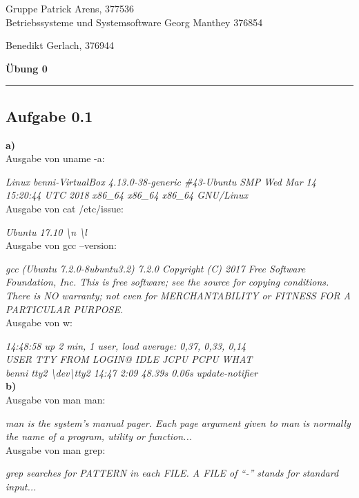 \documentclass[a4paper,graphics,11pt]{article}
\newcommand{\aufgabe}[1]{\subsection*{Aufgabe #1}}
\begin{document}
\noindent Gruppe              \hfill Patrick Arens, 377536\\
\noindent Betriebssysteme und Systemsoftware    \hfill Georg Manthey 376854\\
                                                \strut\hfill Benedikt Gerlach, 376944\\
\begin{center}
	\LARGE{\textbf{Übung 0}}
\end{center}
\begin{center}
\rule[0.1ex]{\textwidth}{1pt}
\end{center}

\aufgabe{0.1}
\textbf{a)}\\

Ausgabe von uname -a:

\textit{Linux benni-VirtualBox 4.13.0-38-generic \#43-Ubuntu SMP Wed Mar 14 15:20:44 UTC 2018 x86\_64 x86\_64 x86\_64 GNU/Linux}\\

Ausgabe von cat /etc/issue:

\textit{Ubuntu 17.10 \textbackslash n \textbackslash l}\\

Ausgabe von gcc --version:

\textit{gcc (Ubuntu 7.2.0-8ubuntu3.2) 7.2.0
Copyright (C) 2017 Free Software Foundation, Inc.
This is free software; see the source for copying conditions.  There is NO
warranty; not even for MERCHANTABILITY or FITNESS FOR A PARTICULAR PURPOSE.}\\

Ausgabe von w:

\textit{14:48:58 up 2 min,  1 user,  load average: 0,37, 0,33, 0,14\\
USER     TTY      FROM             LOGIN@   IDLE   JCPU   PCPU WHAT\\
benni    tty2     \textbackslash dev\textbackslash tty2        14:47    2:09  48.39s  0.06s update-notifier}\\

\textbf{b)}\\

Ausgabe von man man:
 
\textit{man is the system's manual pager.  Each page argument given to  man  is
normally  the  name of a program, utility or function...}\\

Ausgabe von man grep:

\textit{grep  searches  for  PATTERN  in  each  FILE.  A FILE of “-” stands for
standard input...}\\
\end{document}
